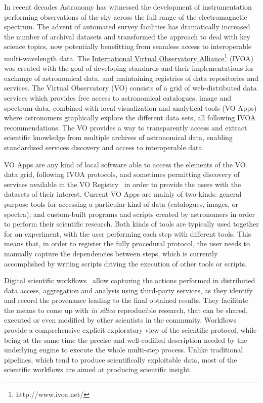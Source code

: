 \documentclass{aa}
\begin{document}
In recent decades Astronomy has witnessed the development of instrumentation performing observations of the sky across the full range of the electromagnetic spectrum. The advent of automated survey facilities has dramatically increased the number of archival datasets and transformed the approach to deal with key science topics, now potentially benefitting from seamless access to interoperable multi-wavelength data. The \href{http://www.ivoa.net/}{International Virtual  Observatory Alliance}\footnote{http://www.ivoa.net/} (IVOA) was created with the goal of developing standards and their implementations for exchange of astronomical data, and maintaining registries of data repositories and services. The Virtual Observatory (VO) consists of a grid of web-distributed data services which provides free access to astronomical catalogues, image and spectrum data, combined with local visualization and analytical tools (VO Apps) where astronomers graphically explore the different data sets, all following IVOA recommendations. The VO provides a way to transparently access and extract scientific knowledge from multiple archives of astronomical data, enabling standardised services discovery and access to interoperable data. 

VO Apps are any kind of local software able to access the elements of the VO data grid, following IVOA protocols, and sometimes permitting discovery of services available in the VO Registry~\citep{Benson2009} in order to provide the users with the datasets of their interest. Current VO Apps are mainly of two-kinds: general purpose tools for accessing a particular kind of data (catalogues, images, or spectra); and custom-built programs and scripts created by astronomers in order to perform their scientific research. Both kinds of tools are typically used together for an experiment, with the user performing each step with different tools. This means that, in order to register the fully procedural protocol, the user needs to manually capture the dependencies between steps, which is currently accomplished by writing scripts driving the execution of other tools or scripts.

Digital scientific workflows~\citep{Gil2007, Gil2008} allow capturing the actions performed in distributed data access, aggregation and analysis using third-party services, as they identify and record the provenance leading to the final obtained results. They facilitate the means to come up with \emph{in silico} reproducible research, that can be shared, executed or even modified by other scientists in the community. Workflows provide a comprehensive explicit exploratory view of the scientific protocol, while being at the same time the precise and well-codified description needed by the underlying engine to execute the whole multi-step process. Unlike traditional pipelines, which tend to produce scientifically exploitable data, most of the scientific workflows are aimed at producing scientific insight.
\end{document}

